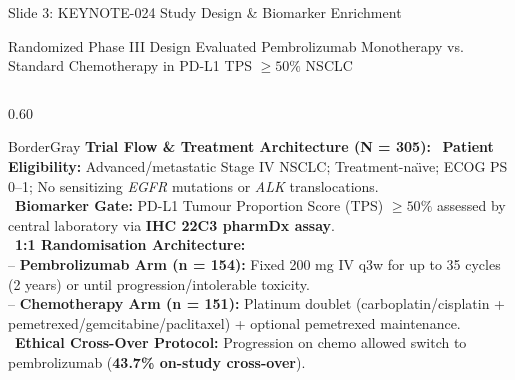 \documentclass[aspectratio=169,10pt]{beamer}
\begin{document}
\begin{frame}{Slide 3: KEYNOTE-024 Study Design \& Biomarker Enrichment}
\begin{actionbanner}
Randomized Phase III Design Evaluated Pembrolizumab Monotherapy vs. Standard Chemotherapy in PD-L1 TPS $\ge 50\%$ NSCLC
\end{actionbanner}

\vspace{2pt}

\begin{columns}[T]
  \begin{column}{0.60\textwidth}
    \begin{statcard}{BorderGray}
      {\footnotesize\textbf{\color{DeepNavy}Trial Flow \& Treatment Architecture (N = 305):}}
      \vskip 2pt
      \scriptsize
      \textbullet\ \textbf{Patient Eligibility:} Advanced/metastatic Stage IV NSCLC; Treatment-na\"\i ve; ECOG PS 0--1; No sensitizing \textit{EGFR} mutations or \textit{ALK} translocations.\\[2pt]
      \textbullet\ \textbf{Biomarker Gate:} PD-L1 Tumour Proportion Score (TPS) $\ge 50\%$ assessed by central laboratory via \textbf{IHC 22C3 pharmDx assay}.\\[2pt]
      \textbullet\ \textbf{1:1 Randomisation Architecture:}\\
      \hspace*{8pt}-- \textbf{Pembrolizumab Arm (n = 154):} Fixed 200 mg IV q3w for up to 35 cycles (2 years) or until progression/intolerable toxicity.\\
      \hspace*{8pt}-- \textbf{Chemotherapy Arm (n = 151):} Platinum doublet (carboplatin/cisplatin + pemetrexed/gemcitabine/paclitaxel) + optional pemetrexed maintenance.\\[2pt]
      \textbullet\ \textbf{Ethical Cross-Over Protocol:} Progression on chemo allowed switch to pembrolizumab (\textbf{43.7\% on-study cross-over}).
    \end{statcard}
  \end{column}
  

\end{columns}
\end{frame}
\end{document}
